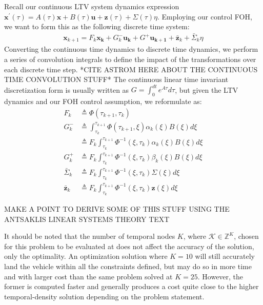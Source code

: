 Recall our continuous LTV system dynamics expression $\mathbf{x}^\prime(\tau) =  A(\tau)\mathbf{x} + B(\tau)\mathbf{u} + \mathbf{z}(\tau) + \Sigma(\tau)\eta$. Employing our control FOH, we want to form this as the following discrete time system:
\begin{align}
	\mathbf{x}_{k+1} = F_k\mathbf{x_k} + G^-_k\mathbf{u_k} + G^+\mathbf{u_{k+1}} + \bar{\mathbf{z}}_k + \bar{\Sigma}_k\eta
\end{align}
Converting the continuous time dynamics to discrete time dynamics, we perform a series of convolution integrals to define the impact of the transformations over each discrete time step. *CITE ASTROM HERE ABOUT THE CONTINUOUS TIME CONVOLUTION STUFF* The continuous linear time invariant discretization form is usually written as $G=\int_{0}^{dt} e^{A \tau} d \tau$, but given the LTV dynamics and our FOH control assumption, we reformulate as:
%
\begin{subequations}
\label{disc}
 \begin{align}
 F_k &\triangleq  \Phi(\tau_{k+1},\tau_k)\\
 G^-_k &\triangleq \int_{\tau_k}^{\tau_{k+1}}  \Phi(\tau_{k+1},\xi) \alpha_k(\xi)B(\xi) d\xi\\
 &\triangleq F_k \int_{\tau_k}^{\tau_{k+1}}  \Phi^{-1}(\xi,\tau_{k}) \alpha_k(\xi)B(\xi) d\xi\\
 G^+_k &\triangleq F_k \int_{\tau_k}^{\tau_{k+1}}  \Phi^{-1}(\xi,\tau_{k}) \beta_k(\xi)B(\xi) d\xi\\
 \bar{\Sigma}_k &\triangleq  F_k \int_{\tau_k}^{\tau_{k+1}} \Phi^{-1}(\xi,\tau_{k}) \Sigma(\xi) d\xi\\
 \bar{\mathbf{z}}_k &\triangleq F_k \int_{\tau_k}^{\tau_{k+1}} \Phi^{-1}(\xi,\tau_{k}) \mathbf{z}(\xi) d\xi
\end{align}
\end{subequations}

MAKE A POINT TO DERIVE SOME OF THIS STUFF USING THE ANTSAKLIS LINEAR SYSTEMS THEORY TEXT

It should be noted that the number of temporal nodes $K$, where $\mathcal{K} \in \mathbb{Z}^K$, chosen for this problem to be evaluated at does not affect the accuracy of the solution, only the optimality. An optimization solution where $K=10$ will still accurately land the vehicle within all the constraints defined, but may do so in more time and with larger cost than the same problem solved at $K=25$. However, the former is computed faster and generally produces a cost quite close to the higher temporal-density solution depending on the problem statement.

